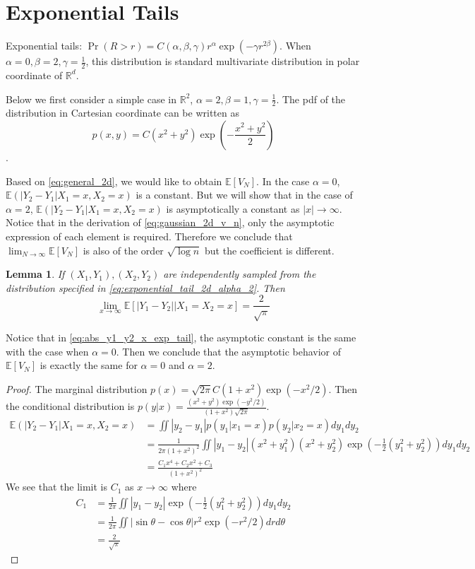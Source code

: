 \documentclass{article}
\newtheorem{lemma}{Lemma}
\def\E{\mathbb{E}}
\def\R{\mathbb{R}}
\begin{document}
\section{Exponential Tails}
Exponential tails: $\Pr(R>r) = C(\alpha, \beta, \gamma) r^{\alpha} \exp(-\gamma r^{2\beta})$.
When $\alpha=0, \beta=2, \gamma=\frac{1}{2}$,
this distribution is standard multivariate distribution in polar coordinate of $\R^d$.

Below we first consider a simple case in $\R^2$,
$\alpha=2,\beta=1, \gamma=\frac{1}{2}$.
The pdf of the distribution in Cartesian coordinate
can be written
as 
\begin{equation}\label{eq:exponential_tail_2d_alpha_2}
    p(x,y) = C(x^2+y^2) \exp(-\frac{x^2+y^2}{2})    
\end{equation}
.

Based on \eqref{eq:general_2d}, we would like to obtain $\E[V_N]$.
In the case $\alpha=0$, $\E(|Y_2-Y_1|X_1=x,X_2=x)$ is a constant.
But we will show that in the case of $\alpha=2$,
$\E(|Y_2-Y_1|X_1=x,X_2=x)$ is asymptotically a constant as $|x|\to\infty$.
Notice that in the derivation of \eqref{eq:gaussian_2d_v_n},
only the asymptotic expression of each element is required.
Therefore we conclude that
$\lim_{N\to \infty} \E[V_N]$ is also of the order $\sqrt{\log n}$
but the coefficient is different.
\begin{lemma}\label{lem:limit_expectation_y1_minus_y2}
If $(X_1,Y_1), (X_2,Y_2)$ are independently
sampled from the distribution specified in \eqref{eq:exponential_tail_2d_alpha_2}.
Then 
\begin{equation}\label{eq:abs_y1_y2_x_exp_tail}
\lim_{x\to \infty} \E[|Y_1-Y_2| \Big\vert X_1=X_2=x] = \frac{2}{\sqrt{\pi}}
\end{equation}
\end{lemma}
Notice that in \eqref{eq:abs_y1_y2_x_exp_tail}, the asymptotic constant is the same
with the case when $\alpha=0$. Then we conclude that the asymptotic behavior
of $\E[V_N]$ is exactly the same for $\alpha=0$ and $\alpha=2$.
\begin{proof}
    The marginal distribution $p(x)=\sqrt{2\pi} C(1+x^2) \exp(-x^2/2)$.
    Then the conditional distribution is $p(y|x)
    = \frac{(x^2+y^2)\exp(-y^2/2)}{(1+x^2)\sqrt{2\pi}}$.
    \begin{align*}
        \E(|Y_2-Y_1|X_1=x,X_2=x)
        & = \iint |y_2-y_1| p(y_1 |x_1=x)p(y_2 | x_2=x)
        dy_1dy_2 \\
        & = \frac{1}{2\pi(1+x^2)^2} \iint |y_1-y_2|
        (x^2+y_1^2)(x^2+y_2^2) \exp(-\frac{1}{2} (y^2_1+y^2_2)) dy_1dy_2\\
        &= \frac{C_1 x^4 + C_2x^2+C_3}{(1+x^2)^2}
    \end{align*}
    We see that the limit is $C_1$ as $x\to \infty$ where
    \begin{align*}
        C_1 &= \frac{1}{2\pi} \iint |y_1-y_2| \exp(-\frac{1}{2} (y^2_1+y^2_2)) dy_1dy_2 \\
        &= \frac{1}{2\pi} \iint |\sin \theta- \cos \theta|
        r^2\exp(-r^2/2) drd\theta \\
        &= \frac{2}{\sqrt{\pi}}
    \end{align*}
\end{proof}
\end{document}
